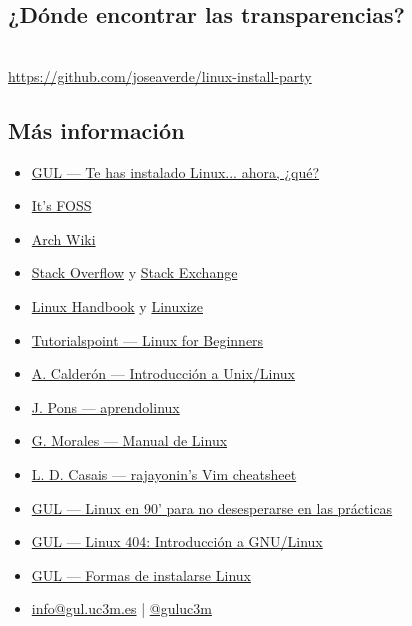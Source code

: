 \documentclass[aspectratio=43]{beamer}
\begin{document}
    \subsection{¿Dónde encontrar las transparencias?}
    \begin{frame}[plain]{\subsecname}
        \centering{}
        \hphantom{}\\
        \url{https://github.com/joseaverde/linux-install-party}
    \end{frame}
    \subsection{Más información}
    \begin{frame}{\secname}{\subsecname}
        \begin{itemize}
            \item \href{https://github.com/rajayonin/linux-now-what}{GUL — Te has instalado Linux... ahora, ¿qué?}
            \item \href{https://itsfoss.com/}{It's FOSS}
            \item \href{https://wiki.archlinux.org/}{Arch Wiki}
            \item \href{https://stackoverflow.com/}{Stack Overflow} y \href{https://stackoverflow.com/}{Stack Exchange}
            \item \href{https://stackoverflow.com/}{Linux Handbook} y \href{https://linuxize.com/}{Linuxize}
            \item \href{https://www.tutorialspoint.com/unix/index.htm}{Tutorialspoint — Linux for Beginners}
            \item \href{https://github.com/acaldero/uc3m_linux}{A. Calderón — Introducción a Unix/Linux}
            \item \href{https://aprendolinux.com}{J. Pons — aprendolinux}
            \item \href{https://github.com/gmorales08/ManualLinux/blob/master/MANUAL_LINUX}{G. Morales — Manual de Linux}
            \item \href{https://github.com/rajayonin/cheatsheets/blob/main/vim_cheatsheet.md}{L. D. Casais — rajayonin's Vim cheatsheet}
            \item \href{https://youtu.be/2qZBUa93MQ8}{GUL — Linux en 90' para no desesperarse en las prácticas}
            \item \href{https://cloud-gul.uc3m.es/s/4qXKozr7DmDSZiN}{GUL — Linux 404: Introducción a GNU/Linux}
            \item \href{https://github.com/guluc3m/linux404/blob/main/README.md}{GUL — Formas de instalarse Linux}
            \item \href{mailto:info@gul.uc3m.es}{info@gul.uc3m.es} | \href{https://twitter.com/guluc3m}{@guluc3m}
        \end{itemize}
    \end{frame}
\end{document}
